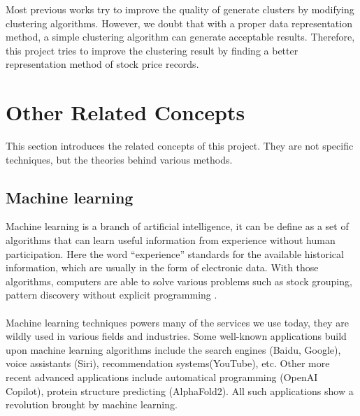 Most previous works try to improve the quality of generate clusters by modifying clustering algorithms. However, we doubt that with a proper data representation method, a simple clustering algorithm can generate acceptable results. Therefore, this project tries to improve the clustering result by finding a better representation method of stock price records.

\section{Other Related Concepts}
This section introduces the related concepts of this project. They are not specific techniques, but the theories behind various methods.

\subsection{Machine learning}
Machine learning is a branch of artificial intelligence, it can be define as a set of algorithms that can learn useful information from experience without human participation. Here the word ``experience'' standards for the available historical information, which are usually in the form of electronic data. With those algorithms, computers are able to solve various problems such as stock grouping, pattern discovery without explicit programming \cite{mohri2018foundations}. \\
\\Machine learning techniques powers many of the services we use today, they are wildly used in various fields and industries. Some well-known applications build upon machine learning algorithms include the search engines (Baidu, Google), voice assistants (Siri), recommendation systems(YouTube), etc. Other more recent advanced applications include automatical programming (OpenAI Copilot), protein structure predicting (AlphaFold2). All such applications show a revolution brought by machine learning.\\
